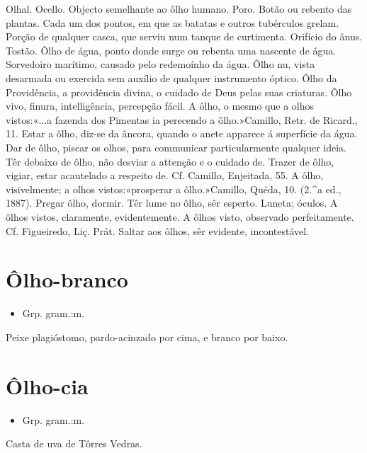 Olhal.
Ocello.
Objecto semelhante ao ôlho humano.
Poro.
Botão ou rebento das plantas.
Cada um dos pontos, em que as batatas e outros tubérculos grelam.
Porção de qualquer casca, que serviu num tanque de curtimenta.
Orifício do ânus.
Tostão.
\textunderscore Ôlho de água\textunderscore , ponto donde surge ou rebenta uma nascente de água.
Sorvedoiro marítimo, causado pelo redemoínho da água.
\textunderscore Ôlho nu\textunderscore , vista desarmada ou exercida sem auxílio de qualquer instrumento óptico.
\textunderscore Ôlho da Providência\textunderscore , a providência divina, o cuidado de Deus pelas suas criaturas.
\textunderscore Ôlho vivo\textunderscore , finura, intelligência, percepção fácil.
\textunderscore A ôlho\textunderscore , o mesmo que a \textunderscore olhos vistos\textunderscore :«\textunderscore ...a fazenda dos Pimentas ia perecendo a ôlho.\textunderscore »Camillo, \textunderscore Retr. de Ricard.\textunderscore , 11.
\textunderscore Estar a ôlho\textunderscore , diz-se da âncora, quando o anete apparece á superfície da água.
\textunderscore Dar de ôlho\textunderscore , piscar os olhos, para communicar particularmente qualquer ideia.
\textunderscore Têr debaixo de ôlho\textunderscore , não desviar a attenção e o cuidado de.
\textunderscore Trazer de ôlho\textunderscore , vigiar, estar acautelado a respeito de. Cf. Camillo, \textunderscore Enjeitada\textunderscore , 55.
\textunderscore A ôlho\textunderscore , visivelmente; a olhos vistos:«\textunderscore prosperar a ôlho.\textunderscore »Camillo, \textunderscore Quéda\textunderscore , 10. (2.^a ed., 1887).
\textunderscore Pregar ôlho\textunderscore , dormir.
\textunderscore Têr lume no ôlho\textunderscore , sêr esperto.
Luneta; óculos.
\textunderscore A ôlhos vistos\textunderscore , claramente, evidentemente.
\textunderscore A ôlhos visto\textunderscore , observado perfeitamente. Cf. Figueiredo, \textunderscore Liç. Prát.\textunderscore 
\textunderscore Saltar aos ôlhos\textunderscore , sêr evidente, incontestável.
\section{Ôlho-branco}
\begin{itemize}
\item {Grp. gram.:m.}
\end{itemize}
Peixe plagióstomo, pardo-acinzado por cima, e branco por baixo.
\section{Ôlho-cia}
\begin{itemize}
\item {Grp. gram.:m.}
\end{itemize}
Casta de uva de Tôrres Vedras.
